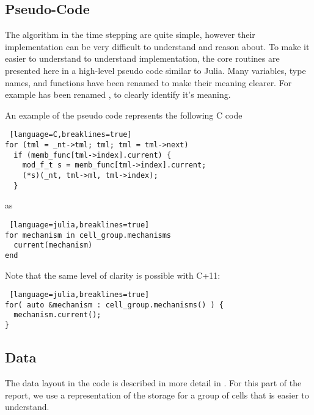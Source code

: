 \subsection{Pseudo-Code}
The algorithm in the time stepping are quite simple, however their implementation can be very difficult to understand and reason about. To make it easier to understand to understand implementation, the core routines are presented here in a high-level pseudo code similar to Julia. Many variables, type names, and functions have been renamed to make their meaning clearer. For example  has been renamed , to clearly identify it's meaning.

An example of the pseudo code represents the following C code
\begin{shaded}
\begin{lstlisting} [language=C,breaklines=true]
for (tml = _nt->tml; tml; tml = tml->next)
  if (memb_func[tml->index].current) {
    mod_f_t s = memb_func[tml->index].current;
    (*s)(_nt, tml->ml, tml->index);
  }
\end{lstlisting}
\end{shaded}
\noindent as
\begin{shaded}
\begin{lstlisting} [language=julia,breaklines=true]
for mechanism in cell_group.mechanisms
  current(mechanism)
end
\end{lstlisting}
\end{shaded}
\noindent Note that the same level of clarity is possible with C+11:
\begin{shaded}
\begin{lstlisting} [language=julia,breaklines=true]
for( auto &mechanism : cell_group.mechanisms() ) {
  mechanism.current();
}
\end{lstlisting}
\end{shaded}

\subsection{Data}
The data layout in the \neuron code is described in more detail in . For this part of the report, we use a representation of the storage for a group of cells that is easier to understand.

